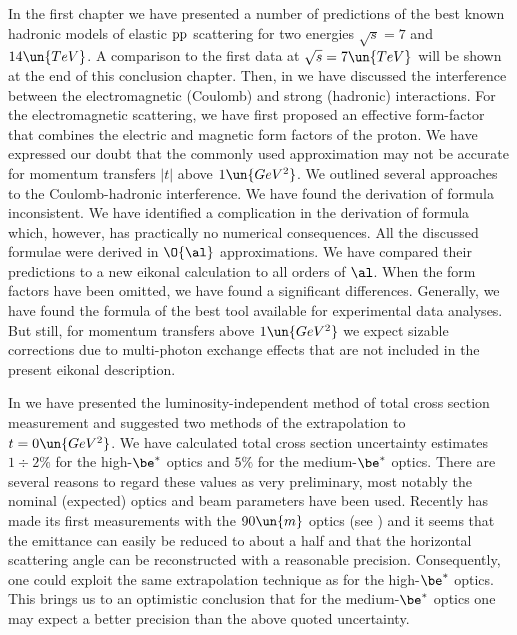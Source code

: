\def\CaptionPrefix{C.}

In the first chapter we have presented a number of predictions of the best known hadronic models of elastic $\rm pp$ scattering for two  energies $\sqrt s = 7$ and $14\un{TeV}$. A comparison to the first  data at $\sqrt s = 7\un{TeV}$ will be shown at the end of this conclusion chapter. Then, in  we have discussed the interference between the electromagnetic (Coulomb) and strong (hadronic) interactions. For the electromagnetic scattering, we have first proposed an effective form-factor that combines the electric and magnetic form factors of the proton. We have expressed our doubt that the commonly used  approximation may not be accurate for momentum transfers $|t|$ above $1\un{GeV^2}$. We outlined several approaches to the Coulomb-hadronic interference. We have found the derivation of \WaY{} formula inconsistent. We have identified a complication in the derivation of \KaL{} formula which, however, has practically no numerical consequences. All the discussed formulae were derived in $\O{\al}$ approximations. We have compared their predictions to a new eikonal calculation to all orders of $\al$. When the form factors have been omitted, we have found a significant differences. Generally, we have found the formula of \KaL{} the best tool available for experimental data analyses. But still, for momentum transfers above $1\un{GeV^2}$ we expect sizable corrections due to multi-photon exchange effects that are not included in the present eikonal description.

In  we have presented the luminosity-independent method of total cross section measurement and suggested two methods of the extrapolation to $t=0\un{GeV^2}$. We have calculated total cross section uncertainty estimates $1\div2\percent$ for the high-$\be^*$ optics and $5\percent$ for the medium-$\be^*$ optics. There are several reasons to regard these values as very preliminary, most notably the nominal (expected) optics and beam parameters have been used. Recently  has made its first measurements with the $90\un{m}$ optics (see ) and it seems that the emittance can easily be reduced to about a half and that the horizontal scattering angle can be reconstructed with a reasonable precision. Consequently, one could exploit the same extrapolation technique as for the high-$\be^*$ optics. This brings us to an optimistic conclusion that for the medium-$\be^*$ optics one may expect a better precision than the above quoted uncertainty.

